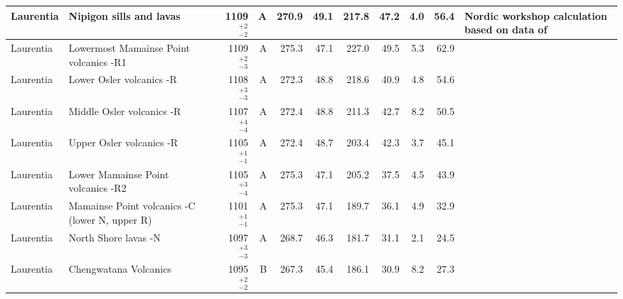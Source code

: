\begin{ThreePartTable}
\begin{longtable}{p{1.4 in}p{1.2 in}rrrrrrrrp{1.2 in}}
                     Laurentia &                            Nipigon sills and lavas &     1109$^{+2}_{-2}$ &      A &     270.9 &      49.1 & 217.8 &  47.2 &       4.0 &        56.4 &  Nordic workshop calculation based on data of \cite{Palmer1970a, Robertson1971a, Pesonen1979a, Pesonen1979b, Middleton2004a, Borradaile2006a} \\ \hline
                     Laurentia &             Lowermost Mamainse Point volcanics -R1 &     1109$^{+2}_{-3}$ &      A &     275.3 &      47.1 & 227.0 &  49.5 &       5.3 &        62.9 &                         \cite{Swanson-Hysell2014a} \\ \hline
                     Laurentia &                           Lower Osler volcanics -R &     1108$^{+3}_{-3}$ &      A &     272.3 &      48.8 & 218.6 &  40.9 &       4.8 &        54.6 &                         \cite{Swanson-Hysell2014b} \\ \hline
                     Laurentia &                          Middle Osler volcanics -R &     1107$^{+4}_{-4}$ &      A &     272.4 &      48.8 & 211.3 &  42.7 &       8.2 &        50.5 &                         \cite{Swanson-Hysell2014b} \\ \hline
                     Laurentia &                           Upper Osler volcanics -R &     1105$^{+1}_{-1}$ &      A &     272.4 &      48.7 & 203.4 &  42.3 &       3.7 &        45.1 &  \cite{Halls1974a, Swanson-Hysell2014b, Swanson-Hysell2019a} \\ \hline
                     Laurentia &                 Lower Mamainse Point volcanics -R2 &     1105$^{+3}_{-4}$ &      A &     275.3 &      47.1 & 205.2 &  37.5 &       4.5 &        43.9 &                         \cite{Swanson-Hysell2014a} \\ \hline
                     Laurentia &     Mamainse Point volcanics -C (lower N, upper R) &     1101$^{+1}_{-1}$ &      A &     275.3 &      47.1 & 189.7 &  36.1 &       4.9 &        32.9 &                         \cite{Swanson-Hysell2014a} \\ \hline
                     Laurentia &                               North Shore lavas -N &     1097$^{+3}_{-3}$ &      A &     268.7 &      46.3 & 181.7 &  31.1 &       2.1 &        24.5 &              \cite{Tauxe2009a,Swanson-Hysell2019a} \\ \hline
                     Laurentia &                              Chengwatana Volcanics &     1095$^{+2}_{-2}$ &      B &     267.3 &      45.4 & 186.1 &  30.9 &       8.2 &        27.3 &                                   \cite{Kean1997a} \\ \hline

\end{longtable}
\end{ThreePartTable}
